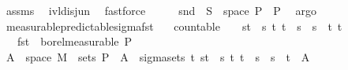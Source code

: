 \begin{isabellebody}
\ assms{\isacharparenleft}{\kern0pt}{}{\isacharcomma}{\kern0pt}{}{\isacharparenright}{\kern0pt}\ \isamarkupfalse%
\ ivl{\isacharunderscore}{\kern0pt}disj{\isacharunderscore}{\kern0pt}un{\isacharparenleft}{\kern0pt}{}{\isacharparenright}{\kern0pt}\ \isamarkupfalse%
\ fastforce\isanewline
\ \ \isamarkupfalse%
\ \isamarkupfalse%
\ {\isachardoublequoteopen}snd\ {\isacharminus}{\kern0pt}{\isacharbackquote}{\kern0pt}\ S\ {\isasyminter}\ space\ {\isasymSigma}\isactrlsub P\ {\isasymin}\ {\isasymSigma}\isactrlsub P{\isachardoublequoteclose}\ \isamarkupfalse%
\ argo\isanewline
{}\isamarkupfalse%
%
\endisatagproof
{\isafoldproof}%
%
\isadelimproof
\isanewline
%
\endisadelimproof
\isanewline
{}\isamarkupfalse%
\ measurable{\isacharunderscore}{\kern0pt}predictable{\isacharunderscore}{\kern0pt}sigma{\isacharunderscore}{\kern0pt}fst{\isacharcolon}{\kern0pt}\isanewline
\ \ \ {\isachardoublequoteopen}countable\ {\isasymI}{\isachardoublequoteclose}\ {\isachardoublequoteopen}{\isasymI}\ {\isasymsubseteq}\ {\isacharbraceleft}{\kern0pt}{\isacharbraceleft}{\kern0pt}s{\isacharless}{\kern0pt}{\isachardot}{\kern0pt}{\isachardot}{\kern0pt}t{\isacharbraceright}{\kern0pt}\ {\isacharbar}{\kern0pt}\ s\ t{\isachardot}{\kern0pt}\ t\ {\isasymle}\ s\ {\isasymand}\ s\ {\isacharless}{\kern0pt}\ t{\isacharbraceright}{\kern0pt}{\isachardoublequoteclose}\ {\isachardoublequoteopen}{\isacharbraceleft}{\kern0pt}t\ {\isasymsubseteq}\ {\isacharparenleft}{\kern0pt}{\isasymUnion}{\isasymI}{\isacharparenright}{\kern0pt}{\isachardoublequoteclose}\isanewline
\ \ \ {\isachardoublequoteopen}fst\ {\isasymin}\ borel{\isacharunderscore}{\kern0pt}measurable\ {\isasymSigma}\isactrlsub P{\isachardoublequoteclose}\isanewline
%
\isadelimproof
%
\endisadelimproof
%
\isatagproof
{}\isamarkupfalse%
\ {\isacharminus}{\kern0pt}\isanewline
\ \ \isamarkupfalse%
\ {\isachardoublequoteopen}A\ {\isasymtimes}\ space\ M\ {\isasymin}\ sets\ {\isasymSigma}\isactrlsub P{\isachardoublequoteclose}\ \ {\isachardoublequoteopen}A\ {\isasymin}\ sigma{\isacharunderscore}{\kern0pt}sets\ {\isacharbraceleft}{\kern0pt}t\ {\isacharbraceleft}{\kern0pt}{\isacharbraceleft}{\kern0pt}s{\isacharless}{\kern0pt}{\isachardot}{\kern0pt}{\isachardot}{\kern0pt}t{\isacharbraceright}{\kern0pt}\ {\isacharbar}{\kern0pt}\ s\ t{\isachardot}{\kern0pt}\ t\ {\isasymle}\ s\ {\isasymand}\ s\ {\isacharless}{\kern0pt}\ t{\isacharbraceright}{\kern0pt}{\isachardoublequoteclose}\ \ A\ \isamarkupfalse%

\end{isabellebody}
